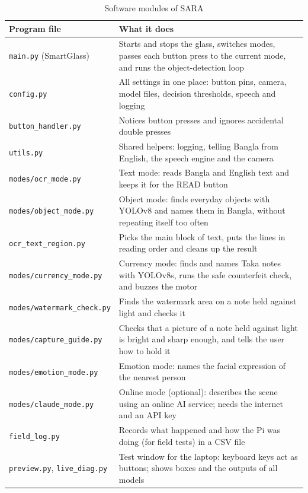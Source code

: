 \begin{table}[!htbp]
\centering
\caption{Software modules of SARA}
\label{tab:modules}
\small
\begin{tabular}{|L{5.6cm}|L{9.0cm}|}
\hline
\textbf{Program file} & \textbf{What it does} \\ \hline
\texttt{main.py} (SmartGlass) & Starts and stops the glass, switches modes, passes each button press to the current mode, and runs the object-detection loop \\ \hline
\texttt{config.py} & All settings in one place: button pins, camera, model files, decision thresholds, speech and logging \\ \hline
\texttt{button\_handler.py} & Notices button presses and ignores accidental double presses \\ \hline
\texttt{utils.py} & Shared helpers: logging, telling Bangla from English, the speech engine and the camera \\ \hline
\texttt{modes/ocr\_mode.py} & Text mode: reads Bangla and English text and keeps it for the READ button \\ \hline
\texttt{modes/object\_mode.py} & Object mode: finds everyday objects with YOLOv8 and names them in Bangla, without repeating itself too often \\ \hline
\texttt{ocr\_text\_region.py} & Picks the main block of text, puts the lines in reading order and cleans up the result \\ \hline
\texttt{modes/currency\_mode.py} & Currency mode: finds and names Taka notes with YOLOv8s, runs the safe counterfeit check, and buzzes the motor \\ \hline
\texttt{modes/watermark\_check.py} & Finds the watermark area on a note held against light and checks it \\ \hline
\texttt{modes/capture\_guide.py} & Checks that a picture of a note held against light is bright and sharp enough, and tells the user how to hold it \\ \hline
\texttt{modes/emotion\_mode.py} & Emotion mode: names the facial expression of the nearest person \\ \hline
\texttt{modes/claude\_mode.py} & Online mode (optional): describes the scene using an online AI service; needs the internet and an API key \\ \hline
\texttt{field\_log.py} & Records what happened and how the Pi was doing (for field tests) in a CSV file \\ \hline
\texttt{preview.py}, \texttt{live\_diag.py} & Test window for the laptop: keyboard keys act as buttons; shows boxes and the outputs of all models \\ \hline

\end{tabular}
\end{table}

